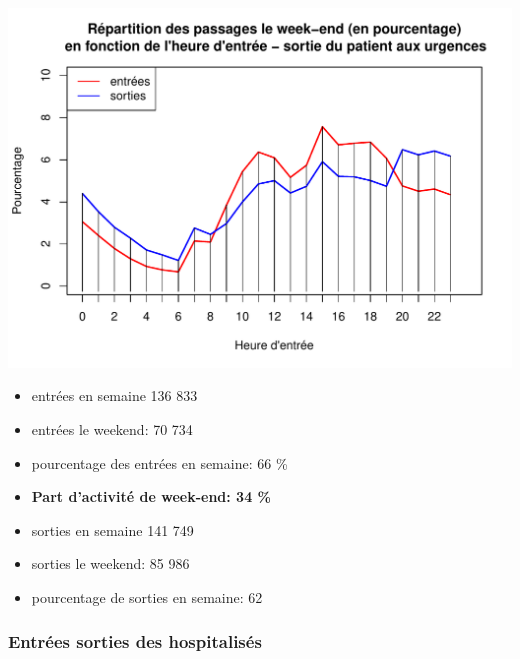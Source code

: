 \documentclass[12pt,english,french,twoside]{book}\usepackage[]{graphicx}\usepackage[]{color}
\makeatletter
\def\maxwidth{ %
  \ifdim\Gin@nat@width>\linewidth
    \linewidth
  \else
    \Gin@nat@width
  \fi
}
\newenvironment{knitrout}{}{} %
\makeatother
\begin{document}
\begin{center}
\begin{knitrout}
\color{fgcolor}
\includegraphics[width=\maxwidth]{figure/graphe2_es_we-1} 

\end{knitrout}
\label{fig:graphe2_es_we} %
\end{center}

\begin{boxedminipage}{10cm}
\begin{itemize}
  \item entrées en semaine 136 833
  \item entrées le weekend: 70 734
  \item pourcentage des entrées en semaine: 66 \%
  \item \textbf{Part d'activité de week-end: 34 \%}
  \item sorties en semaine 141 749
  \item sorties le weekend: 85 986
  \item pourcentage de sorties en semaine: 62
\end{itemize}
\end{boxedminipage}

\subsubsection*{Entrées sorties des hospitalisés}
\end{document}
